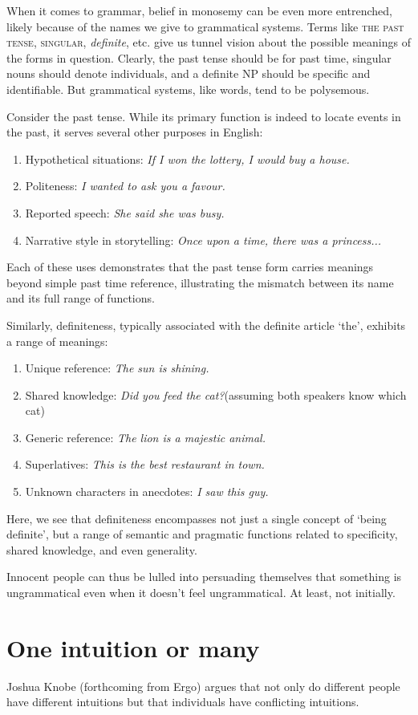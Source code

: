 When it comes to grammar, belief in monosemy can be even more entrenched, likely because of the names we give to grammatical systems. Terms like \textsc{the past tense}, \textsc{singular}, \textit{definite}, etc. give us tunnel vision about the possible meanings of the forms in question. Clearly, the past tense should be for past time, singular nouns should denote individuals, and a definite NP should be specific and identifiable. But grammatical systems, like words, tend to be polysemous.

Consider the past tense. While its primary function is indeed to locate events in the past, it serves several other purposes in English:

\begin{enumerate}
    \item Hypothetical situations: \textit{If I won the lottery, I would buy a house.}
    \item Politeness: \textit{I wanted to ask you a favour.}
    \item Reported speech: \textit{She said she was busy.}
    \item Narrative style in storytelling: \textit{Once upon a time, there was a princess...}
\end{enumerate}

Each of these uses demonstrates that the past tense form carries meanings beyond simple past time reference, illustrating the mismatch between its name and its full range of functions.

Similarly, definiteness, typically associated with the definite article `the', exhibits a range of meanings:

\begin{enumerate}
    \item Unique reference: \textit{The sun is shining.}
    \item Shared knowledge: \textit{Did you feed the cat?}(assuming both speakers know which cat)
    \item Generic reference: \textit{The lion is a majestic animal.}
    \item Superlatives: \textit{This is the best restaurant in town.}
    \item Unknown characters in anecdotes: \textit{I saw this guy.}
\end{enumerate}

Here, we see that definiteness encompasses not just a single concept of `being definite', but a range of semantic and pragmatic functions related to specificity, shared knowledge, and even generality.

Innocent people can thus be lulled into persuading themselves that something is ungrammatical even when it doesn't feel ungrammatical. At least, not initially.

\section{One intuition or many}
Joshua Knobe (forthcoming from Ergo) argues that not only do different people have different intuitions but that individuals have conflicting intuitions.
